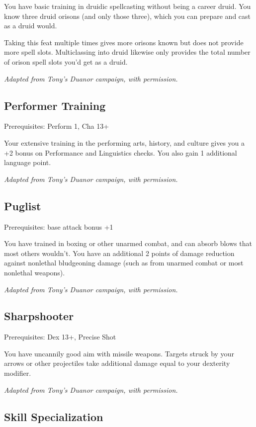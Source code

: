 You have basic training in druidic spellcasting without being a career
druid. You know three druid orisons (and only those three), which you can
prepare and cast as a druid would.

Taking this feat multiple times gives more orisons known but does not
provide more spell slots. Multiclassing into druid likewise only provides
the total number of orison spell slots you'd get as a druid.

\textit{Adapted from Tony's Duanor campaign, with permission.}
%

%
\subsection{Performer Training}

Prerequisites: Perform 1, Cha 13+

Your extensive training in the performing arts, history, and culture
gives you a +2 bonus on Performance and Linguistics checks. You also gain
1 additional language point.

\textit{Adapted from Tony's Duanor campaign, with permission.}
%

%
\subsection{Puglist}

Prerequisites: base attack bonus +1

You have trained in boxing or other unarmed combat, and can absorb blows
that most others wouldn't. You have an additional 2 points of damage
reduction against nonlethal bludgeoning damage (such as from unarmed combat
or most nonlethal weapons).

\textit{Adapted from Tony's Duanor campaign, with permission.}
%

%
\subsection{Sharpshooter}

Prerequisites: Dex 13+, Precise Shot

You have uncannily good aim with missile weapons. Targets struck by your
arrows or other projectiles take additional damage equal to your dexterity
modifier.

\textit{Adapted from Tony's Duanor campaign, with permission.}
%

%
\subsection{Skill Specialization}

